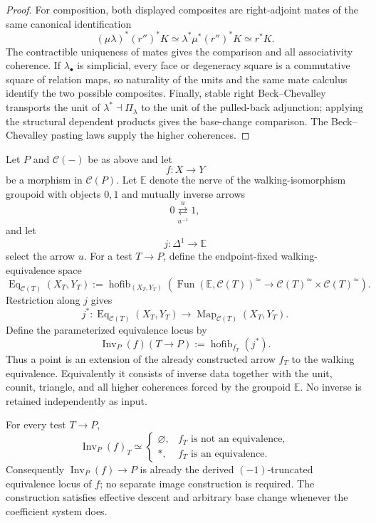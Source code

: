 \begin{proof}
For composition, both displayed composites are right-adjoint mates of the same
canonical identification
\[
(\mu\lambda)^*(r'')^*K
\simeq
\lambda^*\mu^*(r'')^*K
\simeq
r^*K.
\]
The contractible uniqueness of mates gives the comparison and all associativity
coherence.  If $\lambda_\bullet$ is simplicial, every face or degeneracy square is a
commutative square of relation maps, so naturality of the units and the same mate
calculus identify the two possible composites.  Finally, stable right
Beck--Chevalley transports the unit of $\lambda^*\dashv\Pi_\lambda$ to the unit of
the pulled-back adjunction; applying the structural dependent products gives the
base-change comparison.  The Beck--Chevalley pasting laws supply the higher
coherences.
\end{proof}

\begin{construction}
\label{constr:symmetry-noether-parameterized-equivalence-locus}
Let $P$ and $\mathcal C(-)$ be as above and let
\[
f:X\longrightarrow Y
\]
be a morphism in $\mathcal C(P)$.  Let $\mathbb E$ denote the nerve of the
walking-isomorphism groupoid with objects $0,1$ and mutually inverse arrows
\[
0
\mathrel{\overset{u}{\underset{u^{-1}}{\rightleftarrows}}}
1,
\]
and let
\[
j:\Delta^1\longrightarrow\mathbb E
\]
select the arrow $u$.  For a test $T\to P$, define the endpoint-fixed walking-equivalence
space
\[
\operatorname{Eq}_{\mathcal C(T)}(X_T,Y_T)
:=
\operatorname{hofib}_{(X_T,Y_T)}
\left(
\operatorname{Fun}(\mathbb E,\mathcal C(T))^\simeq
\longrightarrow
\mathcal C(T)^\simeq\times\mathcal C(T)^\simeq
\right).
\]
Restriction along $j$ gives
\[
j^*:
\operatorname{Eq}_{\mathcal C(T)}(X_T,Y_T)
\longrightarrow
\operatorname{Map}_{\mathcal C(T)}(X_T,Y_T).
\]
Define the parameterized equivalence locus by
\[
\boxed{
\operatorname{Inv}_P(f)(T\to P)
:=
\operatorname{hofib}_{f_T}(j^*).
}
\]
Thus a point is an extension of the already constructed arrow $f_T$ to the
walking equivalence.  Equivalently it consists of inverse data together with the
unit, counit, triangle, and all higher coherences forced by the groupoid
$\mathbb E$.  No inverse is retained independently as input.
\end{construction}

\begin{lemma}
\label{lem:symmetry-noether-recognition-and-descent-of-the-equivalence-locus}
For every test $T\to P$,
\[
\operatorname{Inv}_P(f)_T\simeq
\begin{cases}
\varnothing,& f_T\text{ is not an equivalence},\\
*,& f_T\text{ is an equivalence}.
\end{cases}
\]
Consequently $\operatorname{Inv}_P(f)\to P$ is already the derived
$(-1)$-truncated equivalence locus of $f$; no separate image construction is
required.  The construction satisfies effective descent and arbitrary base change
whenever the coefficient system does.
\end{lemma}

